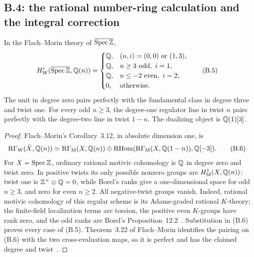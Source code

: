












\subsection{B.4: the rational number-ring calculation and the integral correction}
\begin{theorem}\label{thm:B-SpecZ-Q}
In the Flach--Morin theory of \(\overline{\operatorname{Spec}\mathbb Z}\),
\[
H^i_{\mathrm W}(\overline{\operatorname{Spec}\mathbb Z},\mathbb Q(n))=
\begin{cases}
\mathbb Q,&(n,i)=(0,0)\text{ or }(1,3),\\
\mathbb Q,&n\ge3\text{ odd},\ i=1,\\
\mathbb Q,&n\le-2\text{ even},\ i=2,\\
0,&\text{otherwise}.
\end{cases}\tag{B.5}
\]
The unit in degree zero pairs perfectly with the fundamental class in
degree three and twist one.  For every odd \(n\ge3\), the degree-one
regulator line in twist \(n\) pairs perfectly with the degree-two line
in twist \(1-n\).  The dualizing object is \(\mathbb Q(1)[3]\).
\end{theorem}
\begin{proof}
Flach--Morin's Corollary~3.12, in absolute dimension one, is
\[
\operatorname{R\Gamma}_{\mathrm W}(\bar X,\mathbb Q(n))\simeq
\operatorname{R\Gamma}_{\mathrm M}(X,\mathbb Q(n))\oplus
\operatorname{RHom}(\operatorname{R\Gamma}_{\mathrm M}(X,\mathbb Q(1-n)),\mathbb Q[-3]).\tag{B.6}
\]
For \(X=\operatorname{Spec}\mathbb Z\), ordinary rational motivic cohomology is \(\mathbb Q\)
in degree zero and twist zero.  In positive twists its only possible
nonzero groups are \(H^1_{\mathrm M}(X,\mathbb Q(n))\): twist one is
\(\mathbb Z^\times\otimes\mathbb Q=0\), while Borel's ranks give a one-dimensional
space for odd \(n\ge3\), and zero for even \(n\ge2\).
All negative-twist groups vanish.  Indeed, rational motivic cohomology
of this regular scheme is its Adams-graded rational \(K\)-theory;
the finite-field localization terms are torsion, the positive
even \(K\)-groups have rank zero, and the odd ranks are Borel's
Proposition~12.2~\cite{BBorel1974}.  Substitution in (B.6) proves
every case of (B.5).  Theorem~3.22 of Flach--Morin identifies the
pairing on (B.6) with the two cross-evaluation maps, so it is perfect
and has the claimed degree and twist~\cite[Corollary~3.12,
Theorem~3.22, and \S5.8.3]{BFlachMorin2018}.
\end{proof}

